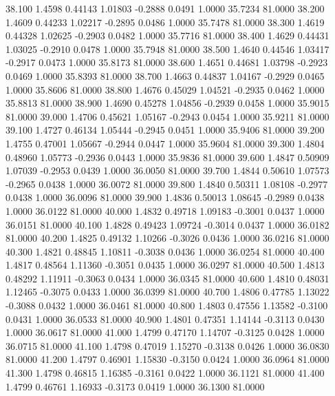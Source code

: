   38.100   1.4598   0.44143   1.01803  -0.2888   0.0491   1.0000  35.7234  81.0000
  38.200   1.4609   0.44233   1.02217  -0.2895   0.0486   1.0000  35.7478  81.0000
  38.300   1.4619   0.44328   1.02625  -0.2903   0.0482   1.0000  35.7716  81.0000
  38.400   1.4629   0.44431   1.03025  -0.2910   0.0478   1.0000  35.7948  81.0000
  38.500   1.4640   0.44546   1.03417  -0.2917   0.0473   1.0000  35.8173  81.0000
  38.600   1.4651   0.44681   1.03798  -0.2923   0.0469   1.0000  35.8393  81.0000
  38.700   1.4663   0.44837   1.04167  -0.2929   0.0465   1.0000  35.8606  81.0000
  38.800   1.4676   0.45029   1.04521  -0.2935   0.0462   1.0000  35.8813  81.0000
  38.900   1.4690   0.45278   1.04856  -0.2939   0.0458   1.0000  35.9015  81.0000
  39.000   1.4706   0.45621   1.05167  -0.2943   0.0454   1.0000  35.9211  81.0000
  39.100   1.4727   0.46134   1.05444  -0.2945   0.0451   1.0000  35.9406  81.0000
  39.200   1.4755   0.47001   1.05667  -0.2944   0.0447   1.0000  35.9604  81.0000
  39.300   1.4804   0.48960   1.05773  -0.2936   0.0443   1.0000  35.9836  81.0000
  39.600   1.4847   0.50909   1.07039  -0.2953   0.0439   1.0000  36.0050  81.0000
  39.700   1.4844   0.50610   1.07573  -0.2965   0.0438   1.0000  36.0072  81.0000
  39.800   1.4840   0.50311   1.08108  -0.2977   0.0438   1.0000  36.0096  81.0000
  39.900   1.4836   0.50013   1.08645  -0.2989   0.0438   1.0000  36.0122  81.0000
  40.000   1.4832   0.49718   1.09183  -0.3001   0.0437   1.0000  36.0151  81.0000
  40.100   1.4828   0.49423   1.09724  -0.3014   0.0437   1.0000  36.0182  81.0000
  40.200   1.4825   0.49132   1.10266  -0.3026   0.0436   1.0000  36.0216  81.0000
  40.300   1.4821   0.48845   1.10811  -0.3038   0.0436   1.0000  36.0254  81.0000
  40.400   1.4817   0.48564   1.11360  -0.3051   0.0435   1.0000  36.0297  81.0000
  40.500   1.4813   0.48292   1.11911  -0.3063   0.0434   1.0000  36.0345  81.0000
  40.600   1.4810   0.48031   1.12465  -0.3075   0.0433   1.0000  36.0399  81.0000
  40.700   1.4806   0.47785   1.13022  -0.3088   0.0432   1.0000  36.0461  81.0000
  40.800   1.4803   0.47556   1.13582  -0.3100   0.0431   1.0000  36.0533  81.0000
  40.900   1.4801   0.47351   1.14144  -0.3113   0.0430   1.0000  36.0617  81.0000
  41.000   1.4799   0.47170   1.14707  -0.3125   0.0428   1.0000  36.0715  81.0000
  41.100   1.4798   0.47019   1.15270  -0.3138   0.0426   1.0000  36.0830  81.0000
  41.200   1.4797   0.46901   1.15830  -0.3150   0.0424   1.0000  36.0964  81.0000
  41.300   1.4798   0.46815   1.16385  -0.3161   0.0422   1.0000  36.1121  81.0000
  41.400   1.4799   0.46761   1.16933  -0.3173   0.0419   1.0000  36.1300  81.0000
